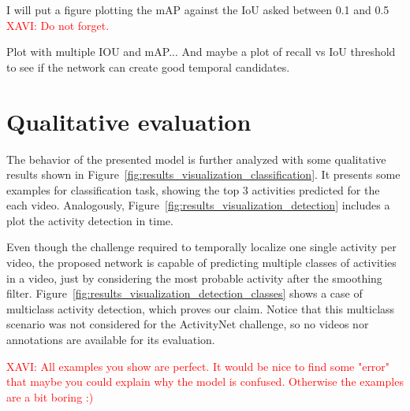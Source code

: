 I will put a figure plotting the mAP against the IoU asked between 0.1 and 0.5
\textcolor{red}{XAVI: Do not forget.}

Plot with multiple IOU and mAP... And maybe a plot of recall vs IoU threshold to see if the network can create good temporal candidates. 

\section{Qualitative evaluation}

The behavior of the presented model is further analyzed with some qualitative results shown in Figure~\ref{fig:results_visualization_classification}. It presents some examples for classification task, showing the top 3 activities predicted for the each video. Analogously, Figure~\ref{fig:results_visualization_detection} includes a plot the activity detection in time.

Even though the challenge required to temporally localize one single activity per video, the proposed network is capable of predicting multiple classes of activities in a video, just by considering the most probable activity after the smoothing filter. 
Figure~\ref{fig:results_visualization_detection_classes} shows a case of multiclass activity detection, which proves our claim.
Notice that this multiclass scenario was not considered for the ActivityNet challenge, so no videos nor annotations are available for its evaluation.

\textcolor{red}{XAVI: All examples you show are perfect. It would be nice to find some "error" that maybe you could explain why the model is confused. Otherwise the examples are a bit boring :)}

